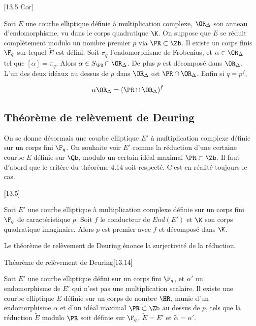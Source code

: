 \begin{Prop}\cite{Lang1987}[13.5 Cor]
	
	Soit $E$ une courbe elliptique définie à multiplication complexe, $\OR_{\Delta}$ son anneau d'endomorphisme, vu dans le corps quadratique $\K$. On suppose que $E$ se réduit complètement modulo un nombre premier $p$ via $\PR\subset\Zb$. Il existe un corps finis $\F_{q}$ sur lequel $\tilde{E}$ est défini. Soit $\pi_{q}$ l'endomorphisme de Frobenius, et $\alpha\in\OR_{\Delta}$ tel que $\widetilde{[\alpha]} = \pi_{q}$. Alors $\alpha\in S_{\PR}\cap\OR_{\Delta}$. De plus $p$ est décomposé dans $\OR_{\Delta}$. L'un des deux idéaux au dessus de $p$ dans $\OR_{\Delta}$ est $\PR\cap\OR_{\Delta}$. Enfin si $q = p^f$,
	
	\begin{equation*}
		\alpha\OR_{\Delta} = \left(\PR\cap\OR_{\Delta} \right) ^{f}
	\end{equation*} 
\end{Prop}











\subsection{Théorème de relèvement de Deuring}

On se donne désormais une courbe elliptique $E'$ à multiplication complexe définie sur un corps fini $\F_{q}$. On souhaite voir $E'$ comme la réduction d'une certaine courbe $E$ définie sur $\Qb$, modulo un certain idéal maximal $\PR\subset\Zb$. Il faut d'abord que le critère du théorème 4.14 soit respecté. C'est en réalité toujours le cas.

\begin{The}\cite{Lang1987}[13.5]
	
	Soit $E'$ une courbe elliptique à multiplication complexe définie sur un corps fini $\F_{q}$ de caractéristique $p$. Soit $f$ le conducteur de $End(E')$ et $\K$ son corps quadratique imaginaire. Alors $p$ est premier avec $f$ et décomposé dans $\K$. 
	
\end{The}

Le théorème de relèvement de Deuring énonce la surjectivité de la réduction. 

\begin{The}{Théorème de relèvement de Deuring}\cite{Lang1987}[13.14]
	
	Soit $E'$ une courbe elliptique défini sur un corps fini $\F_{q}$, et $\alpha'$ un endomorphisme de $E'$ qui n'est pas une multiplication scalaire. Il existe une courbe elliptique $E$ définie sur un corps de nombre $\HR$, munie d'un endomorphisme $\alpha$ et d'un idéal maximal $\PR\subset\Zb$ au dessus de $p$, tels que la réduction $\tilde{E}$ modulo $\PR$ soit définie sur $\F_{q}$, $\tilde{E} = E'$ et $\tilde{\alpha} = \alpha'$.
	
\end{The}

